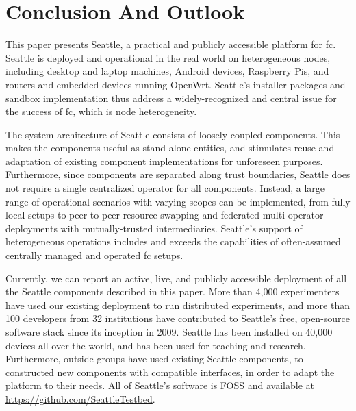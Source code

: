 \section{Conclusion And Outlook}

This paper presents Seattle, a practical and publicly accessible
platform for \gls{fc}. Seattle is deployed and operational in the
real world on heterogeneous nodes,
including desktop and laptop machines, Android devices,
Raspberry Pis,
and routers and embedded devices running OpenWrt.
Seattle's installer packages and sandbox implementation
thus address a widely-recognized and central issue for the
success of \gls{fc}, which is node heterogeneity.

The system architecture of Seattle consists of loosely-coupled
components. This makes the components useful as stand-alone entities,
and stimulates reuse and adaptation of existing component
implementations for unforeseen purposes.
Furthermore, since components are separated along trust boundaries,
Seattle does not require a single centralized operator for all
components. Instead, a large range of operational scenarios with
varying scopes can be implemented, from fully local setups to
peer-to-peer resource swapping and federated multi-operator
deployments with mutually-trusted intermediaries.
Seattle's support of heterogeneous operations includes and exceeds
the capabilities of often-assumed centrally managed and
operated \gls{fc} setups.

Currently, we can report an active, live, and publicly accessible
deployment of all the Seattle components described in this paper.
More than 4,000 experimenters have used our existing deployment
to run distributed experiments, and more than 100 developers from 32 institutions
have contributed to Seattle's free, open-source software stack since
its inception in 2009.
Seattle has been installed on 40,000 devices all over the world, and
has been used
for teaching and research. Furthermore, outside groups have used existing Seattle
components, to constructed new components with compatible interfaces,
in order to adapt the platform to their needs.
All of Seattle's software is \acrlong{FOSS} and available at
\url{https://github.com/SeattleTestbed}.
